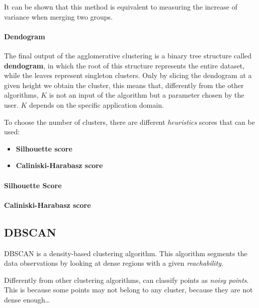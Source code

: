It can be shown that this method is equivalent to measuring the increase of variance when merging two groups.

\paragraph*{Dendogram}
The final output of the agglomerative clustering is a binary tree structure called \textbf{dendogram}, in which the root of this structure represents the entire dataset, while the leaves represent singleton clusters. Only by slicing the dendogram at a given height we obtain the cluster, this means that, differently from the other algorithms, $K$ is not an input of the algorithm but a parameter chosen by the user. $K$ depends on the specific application domain.

To choose the number of clusters, there are different \textit{heuristics} scores that can be used:
\begin{itemize}
    \item \textbf{Silhouette score}
    \item \textbf{Caliniski-Harabasz score}
\end{itemize}

\paragraph*{Silhouette Score}
\paragraph*{Caliniski-Harabasz score}

\subsection*{DBSCAN}
DBSCAN is a density-based clustering algorithm. This algorithm segments the data observations by looking at dense regions with a given \textit{reachability}.


Differently from other clustering algorithms, can classify points as \textit{noisy points}. This is because some points may not belong to any cluster, because they are not dense enough\dots
